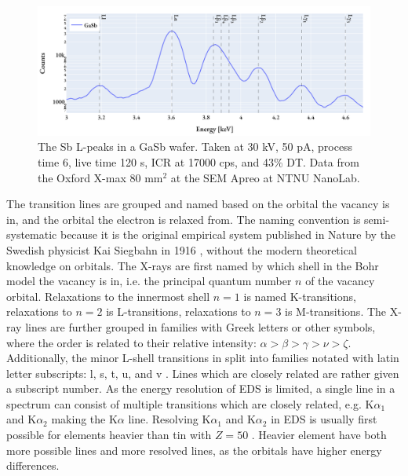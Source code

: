\begin{figure}[p]
    \centering
    \includegraphics[width=0.95\linewidth]{figures/Sb_L-peaks_30kV_50pA.png}
    \caption{
        The Sb L-peaks in a GaSb wafer.
        Taken at 30 kV, 50 pA, process time 6, live time 120 s, ICR at 17000 cps, and 43\% DT.
        Data from the Oxford X-max 80 mm$^2$ at the SEM Apreo at NTNU NanoLab.
    }
    \label{fig:theory:xray_formation:Sb_L-peaks}
\end{figure}




The transition lines are grouped and named based on the orbital the vacancy is in, and the orbital the electron is relaxed from.
The naming convention is semi-systematic because it is the original empirical system published in Nature by the Swedish physicist Kai Siegbahn in 1916 \cite{siegbahn_relations_1916}, without the modern theoretical knowledge on orbitals.
The X-rays are first named by which shell in the Bohr model the vacancy is in, i.e. the principal quantum number $n$ of the vacancy orbital.
Relaxations to the innermost shell $n=1$ is named K-transitions, relaxations to $n=2$ is L-transitions, relaxations to $n=3$ is M-transitions.
The X-ray lines are further grouped in families with Greek letters or other symbols, where the order is related to their relative intensity: $\alpha > \beta > \gamma > \nu > \zeta$.
Additionally, the minor L-shell transitions in split into families notated with latin letter subscripts: l, s, t, u, and v \cite[Ch. 4.2.4]{goldstein_scanning_2018}.
Lines which are closely related are rather given a subscript number.
As the energy resolution of EDS is limited, a single line in a spectrum can consist of multiple transitions which are closely related, e.g. K$\alpha_1$ and K$\alpha_2$ making the K$\alpha$ line.
Resolving K$\alpha_1$ and K$\alpha_2$ in EDS is usually first possible for elements heavier than tin with $ Z = 50$ \cite[Ch. 8.2.2.3]{hollas_modern_2004}. %
Heavier element have both more possible lines and more resolved lines, as the orbitals have higher energy differences.


